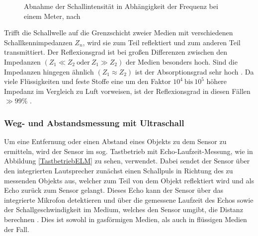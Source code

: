 \begin{figure}[h]
    \begin{center}

        \caption{Abnahme der Schallintensität in Abhängigkeit der Frequenz bei einem Meter, nach \cite{Hering:2023}}
        \label{DiagrammIntensitaet}
    \end{center}
\end{figure}

Trifft die Schallwelle auf die Grenzschicht zweier Medien mit verschiedenen Schallkennimpedanzen $Z_n$, wird sie zum Teil reflektiert und zum anderen Teil transmittiert. Der Reflexionsgrad ist bei großen Differenzen zwischen den Impedanzen $\left(Z_1 \ll Z_2 \:\text{oder} \:Z_1 \gg Z_2\right)$ der Medien besonders hoch. Sind die Impedanzen hingegen ähnlich $\left(Z_1 \approx Z_2\right)$ ist der Absorptionsgrad sehr hoch \cite{Hering:2021b}. 
Da viele Flüssigkeiten und feste Stoffe eine um den Faktor $10^4 \:\text{bis} \:10^5$ höhere Impedanz im Vergleich zu Luft vorweisen, ist der Reflexionsgrad in diesen Fällen $\gg 99\%$ \cite{Hering:2021b,Hering:2023}.

\subsubsection{Weg- und Abstandsmessung mit Ultraschall}

Um eine Entfernung oder einen Abstand eines Objekts zu dem Sensor zu ermitteln, wird der Sensor im sog. Tastbetrieb mit Echo-Laufzeit-Messung, wie in Abbildung \ref{TastbetriebELM} zu sehen, verwendet. Dabei sendet der Sensor über den integrierten Lautsprecher zunächst einen Schallpuls in Richtung des zu messenden Objekts aus, welcher zum Teil von dem Objekt reflektiert wird und als Echo zurück zum Sensor gelangt. Dieses Echo kann der Sensor über das integrierte Mikrofon detektieren und über die gemessene Laufzeit des Echos sowie der Schallgeschwindigkeit im Medium, welches den Sensor umgibt, die Distanz berechnen \cite{Hering:2023}. Dies ist sowohl in gasförmigen Medien, als auch in flüssigen Medien der Fall.

